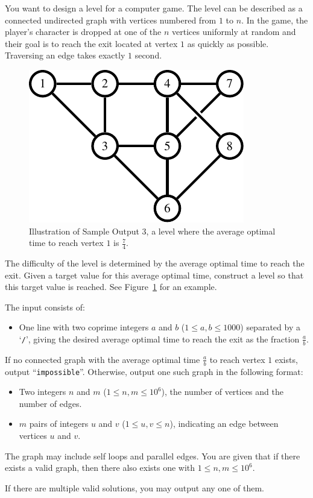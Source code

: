 
You want to design a level for a computer game. The level can be described as
a connected undirected graph with vertices numbered from $1$ to $n$. In the game, the
player's character is dropped at one of the $n$ vertices uniformly at random
and their goal is to reach the exit located at vertex $1$ as quickly as
possible. Traversing an edge takes exactly $1$ second.

\begin{figure}[h]
	\centering
	\includegraphics{sample}
	\caption{Illustration of Sample Output 3, a level where the average
	optimal time to reach vertex $1$ is $\frac{7}{4}$.}
  \label{fig:e}
\end{figure}

The difficulty of the level is determined by the average optimal time
to reach the exit. Given a target value for this average optimal time, construct a
level so that this target value is reached. See Figure~\ref{fig:e} for an example.

\begin{Input}
  The input consists of:
  \begin{itemize}
    \item One line with two coprime integers $a$ and $b$ ($1 \le a,b \le 1000$) separated by a
      `\texttt{/}', giving the desired average optimal time to reach the exit as the fraction $\frac{a}{b}$.
  \end{itemize}
\end{Input}

\begin{Output}
  If no connected graph with the average optimal time $\frac{a}{b}$ to reach vertex $1$ exists,
  output ``\texttt{impossible}''.
  Otherwise, output one such graph in the following format:
  \begin{itemize}
    \item Two integers $n$ and $m$ ($1 \le n, m \le 10^6$), the number
      of vertices and the number of edges.
    \item $m$ pairs of integers $u$ and $v$ ($1 \le u,v \le n$), indicating an edge between vertices $u$ and $v$.
  \end{itemize}
  The graph may include self loops and parallel edges.
  You are given that if there exists a valid graph, then there also exists one with $1 \le n, m \le 10^6$.

  If there are multiple valid solutions, you may output any one of them.
\end{Output}
